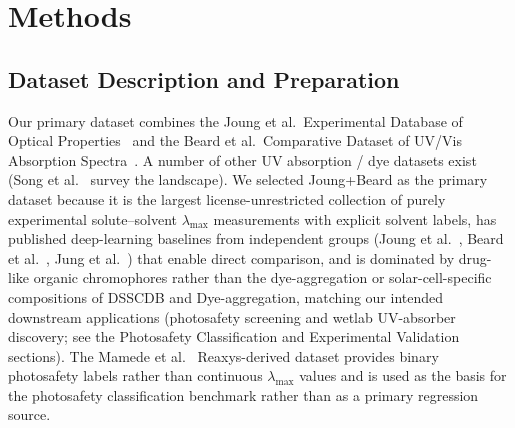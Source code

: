 \documentclass[journal=jcisd8,manuscript=article]{achemso}
\begin{document}
\section{Methods}
\label{sec:methods}

\subsection{Dataset Description and Preparation}
\label{sec:dataset}

Our primary dataset combines the Joung et al.\ Experimental Database of Optical Properties~\cite{joung2020experimental} and the Beard et al.\ Comparative Dataset of UV/Vis Absorption Spectra~\cite{beard2019comparative}.
A number of other UV absorption / dye datasets exist (Song et al.~\cite{song2025fluortools} survey the landscape). We selected Joung+Beard as the primary dataset because it is the largest license-unrestricted collection of purely experimental solute--solvent $\lambda_{\max}$ measurements with explicit solvent labels, has published deep-learning baselines from independent groups (Joung et al.~\cite{joung2021deep}, Beard et al.~\cite{beard2019comparative}, Jung et al.~\cite{jung2024machine}) that enable direct comparison, and is dominated by drug-like organic chromophores rather than the dye-aggregation or solar-cell-specific compositions of DSSCDB and Dye-aggregation, matching our intended downstream applications (photosafety screening and wetlab UV-absorber discovery; see the Photosafety Classification and Experimental Validation sections). The Mamede et al.~\cite{mamede2021machine} Reaxys-derived dataset provides binary photosafety labels rather than continuous $\lambda_{\max}$ values and is used as the basis for the photosafety classification benchmark rather than as a primary regression source.
\end{document}

